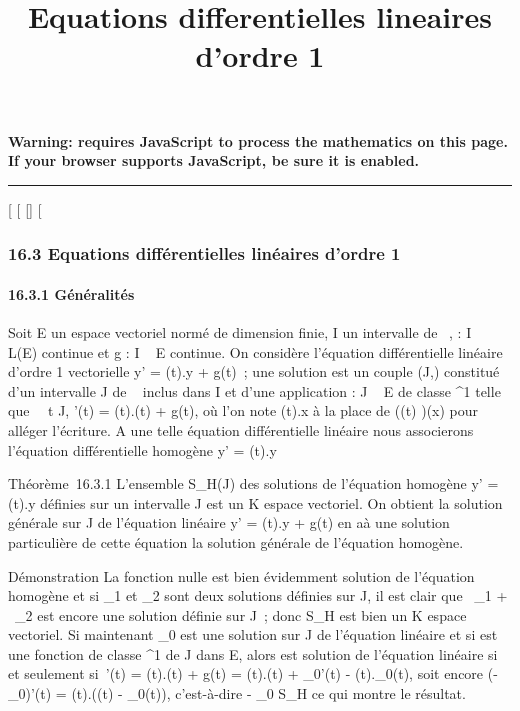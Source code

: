 \documentclass[]{article}
\title{Equations differentielles lineaires d'ordre 1}
\author{}
\date{}
\begin{document}
\maketitle

\textbf{Warning: 
requires JavaScript to process the mathematics on this page.\\ If your
browser supports JavaScript, be sure it is enabled.}

\begin{center}\rule{3in}{0.4pt}\end{center}

{[}
{[}
{[}{]}
{[}

\subsubsection{16.3 Equations différentielles linéaires d'ordre 1}

\paragraph{16.3.1 Généralités}

Soit E un espace vectoriel normé de dimension finie, I un intervalle de
~, \ell : I \rightarrow~ L(E) continue et g : I \rightarrow~ E continue. On considère l'équation
différentielle linéaire d'ordre 1 vectorielle y' = \ell(t).y + g(t)~; une
solution est un couple (J,\phi) constitué d'un intervalle J de ~ inclus
dans I et d'une application \phi : J \rightarrow~ E de classe ^1 telle que
\forall~~t \in J, \phi'(t) = \ell(t).\phi(t) + g(t), où l'on note
\ell(t).x à la place de \left (\ell(t)\right
)(x) pour alléger l'écriture. A une telle équation différentielle
linéaire nous associerons l'équation différentielle homogène y' = \ell(t).y

Théorème~16.3.1 L'ensemble S\_H(J) des solutions de l'équation
homogène y' = \ell(t).y définies sur un intervalle J est un K espace
vectoriel. On obtient la solution générale sur J de l'équation linéaire
y' = \ell(t).y + g(t) en a\jmathoutant à une solution particulière de cette
équation la solution générale de l'équation homogène.

Démonstration La fonction nulle est bien évidemment solution de
l'équation homogène et si \phi\_1 et \phi\_2 sont deux
solutions définies sur J, il est clair que \alpha~\phi\_1 + \beta~\phi\_2
est encore une solution définie sur J~; donc S\_H est bien un K
espace vectoriel. Si maintenant \phi\_0 est une solution sur J de
l'équation linéaire et si \phi est une fonction de classe ^1 de
J dans E, alors \phi est solution de l'équation linéaire si et seulement
si~\phi'(t) = \ell(t).\phi(t) + g(t) = \ell(t).\phi(t) + \phi\_0'(t) -
\ell(t).\phi\_0(t), soit encore (\phi - \phi\_0)'(t) = \ell(t).(\phi(t) -
\phi\_0(t)), c'est-à-dire \phi - \phi\_0 \in S\_H ce qui
montre le résultat.
\end{document}
